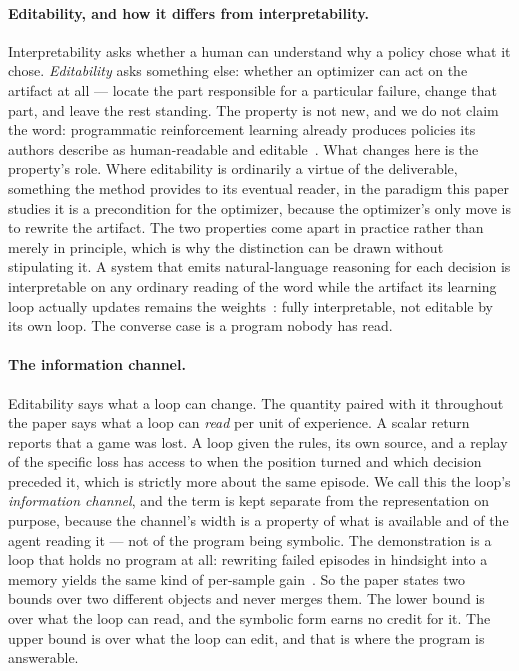 \paragraph{Editability, and how it differs from interpretability.}
Interpretability asks whether a human can understand why a policy chose what it
chose. \emph{Editability} asks something else: whether an optimizer can act on
the artifact at all --- locate the part responsible for a particular failure,
change that part, and leave the rest standing. The property is not new, and we do
not claim the word: programmatic reinforcement learning already produces policies
its authors describe as human-readable and editable~\citep{diprl2026}. What
changes here is the property's role. Where editability is ordinarily a virtue of
the deliverable, something the method provides to its eventual reader, in the
paradigm this paper studies it is a precondition for the optimizer, because the
optimizer's only move is to rewrite the artifact. The two properties come apart in
practice rather than merely in principle, which is why the distinction can be
drawn without stipulating it. A system that emits natural-language reasoning for
each decision is interpretable on any ordinary reading of the word while the
artifact its learning loop actually updates remains the
weights~\citep{tig2025think}: fully interpretable, not editable by its own loop.
The converse case is a program nobody has read.

\paragraph{The information channel.}
Editability says what a loop can change. The quantity paired with it throughout
the paper says what a loop can \emph{read} per unit of experience. A scalar return
reports that a game was lost. A loop given
the rules, its own source, and a replay of the specific loss has access to when
the position turned and which decision preceded it, which is strictly more about
the same episode. We call this the loop's \emph{information channel}, and the term
is kept separate from the representation on purpose, because the channel's width
is a property of what is available and of the agent reading it --- not of the
program being symbolic. The demonstration is a loop that holds no program at all:
rewriting failed episodes in hindsight into a memory yields the same kind of
per-sample gain~\citep{echo2025hindsight}. So the paper states two bounds over two
different objects and never merges them. The lower bound is over what the loop can
read, and the symbolic form earns no credit for it. The upper bound is over what
the loop can edit, and that is where the program is answerable.

